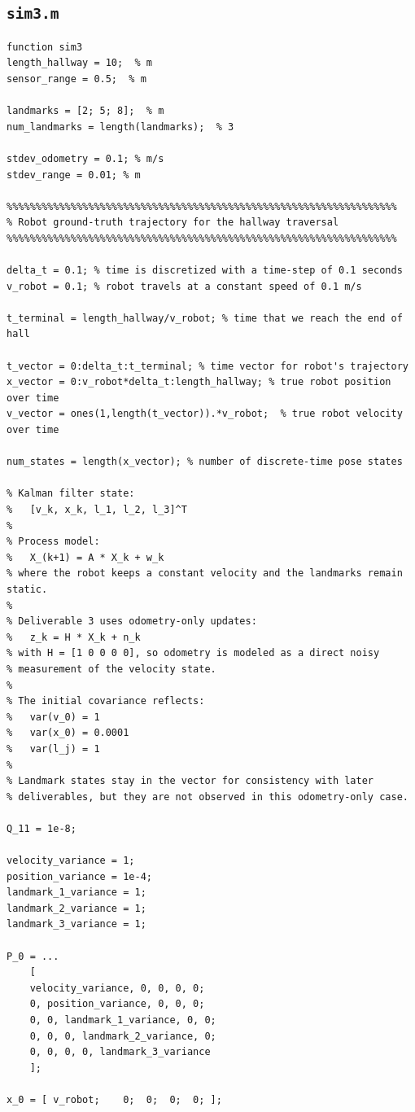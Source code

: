 \documentclass[11pt]{article}
\begin{document}
\subsection*{\texttt{sim3.m}}
\begin{lstlisting}[caption={sim3.m}, label={lst:sim3}]
function sim3
length_hallway = 10;  % m
sensor_range = 0.5;  % m

landmarks = [2; 5; 8];  % m
num_landmarks = length(landmarks);  % 3

stdev_odometry = 0.1; % m/s
stdev_range = 0.01; % m

%%%%%%%%%%%%%%%%%%%%%%%%%%%%%%%%%%%%%%%%%%%%%%%%%%%%%%%%%%%%%%%%%%%
% Robot ground-truth trajectory for the hallway traversal
%%%%%%%%%%%%%%%%%%%%%%%%%%%%%%%%%%%%%%%%%%%%%%%%%%%%%%%%%%%%%%%%%%%

delta_t = 0.1; % time is discretized with a time-step of 0.1 seconds
v_robot = 0.1; % robot travels at a constant speed of 0.1 m/s

t_terminal = length_hallway/v_robot; % time that we reach the end of hall

t_vector = 0:delta_t:t_terminal; % time vector for robot's trajectory
x_vector = 0:v_robot*delta_t:length_hallway; % true robot position over time
v_vector = ones(1,length(t_vector)).*v_robot;  % true robot velocity over time

num_states = length(x_vector); % number of discrete-time pose states

% Kalman filter state:
%   [v_k, x_k, l_1, l_2, l_3]^T
%
% Process model:
%   X_(k+1) = A * X_k + w_k
% where the robot keeps a constant velocity and the landmarks remain static.
%
% Deliverable 3 uses odometry-only updates:
%   z_k = H * X_k + n_k
% with H = [1 0 0 0 0], so odometry is modeled as a direct noisy
% measurement of the velocity state.
%
% The initial covariance reflects:
%   var(v_0) = 1
%   var(x_0) = 0.0001
%   var(l_j) = 1
%
% Landmark states stay in the vector for consistency with later
% deliverables, but they are not observed in this odometry-only case.

Q_11 = 1e-8;

velocity_variance = 1;
position_variance = 1e-4;
landmark_1_variance = 1;
landmark_2_variance = 1;
landmark_3_variance = 1;

P_0 = ...
    [
    velocity_variance, 0, 0, 0, 0;
    0, position_variance, 0, 0, 0;
    0, 0, landmark_1_variance, 0, 0;
    0, 0, 0, landmark_2_variance, 0;
    0, 0, 0, 0, landmark_3_variance
    ];

x_0 = [ v_robot;    0;  0;  0;  0; ];


\end{lstlisting}
\end{document}
